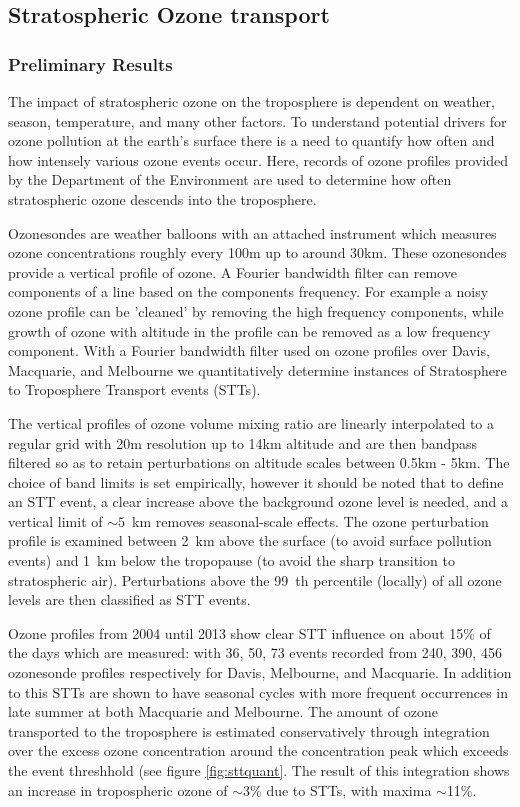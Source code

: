 \subsection{Stratospheric Ozone transport}
\subsubsection{Preliminary Results}
The impact of stratospheric ozone on the troposphere is dependent on weather, season, temperature, and many other factors.
To understand potential drivers for ozone pollution at the earth's surface there is a need to quantify how often and how intensely various ozone events occur.
Here, records of ozone profiles provided by the Department of the Environment are used to determine how often stratospheric ozone descends into the troposphere.

Ozonesondes are weather balloons with an attached instrument which measures ozone concentrations roughly every 100m up to around 30km.
These ozonesondes provide a vertical profile of ozone.
A Fourier bandwidth filter can remove components of a line based on the components frequency.
For example a noisy ozone profile can be 'cleaned' by removing the high frequency components, while growth of ozone with altitude in the profile can be removed as a low frequency component. 
With a Fourier bandwidth filter used on ozone profiles over Davis, Macquarie, and Melbourne we quantitatively determine instances of Stratosphere to Troposphere Transport events (STTs).

The vertical profiles of ozone volume mixing ratio are linearly interpolated to a regular grid with 20m resolution up to 14km altitude and are then bandpass filtered so as to retain perturbations on altitude scales between 0.5km - 5km. 
The choice of band limits is set empirically, however it should be noted that to define an STT event, a clear increase above the background ozone level is needed, and a vertical limit of $\sim 5$~km removes seasonal-scale effects. 
The ozone perturbation profile is examined between 2~km above the surface (to avoid surface pollution events) and 1~km below the tropopause (to avoid the sharp transition to stratospheric air).
Perturbations above the 99~th percentile (locally) of all ozone levels are then classified as STT events.

Ozone profiles from 2004 until 2013 show clear STT influence on about 15\% of the days which are measured: with 36, 50, 73 events recorded from 240, 390, 456 ozonesonde profiles respectively for Davis, Melbourne, and Macquarie.
In addition to this STTs are shown to have seasonal cycles with more frequent occurrences in late summer at both Macquarie and Melbourne.
The amount of ozone transported to the troposphere is estimated conservatively through integration over the excess ozone concentration around the concentration peak which exceeds the event threshhold (see figure \ref{fig:sttquant}.
The result of this integration shows an increase in tropospheric ozone of $\sim$3\% due to STTs, with maxima $\sim$11\%.
 
